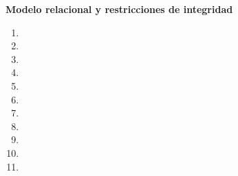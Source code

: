 \documentclass{report}
\begin{document}
    \begin{center}
        \LARGE{\textbf{Modelo relacional y restricciones de integridad}}\vspace{.3cm}
    \end{center}
    \normalsize
    \begin{enumerate}%
        \item 
        \item 
        \item 
        \item 
        \item 
        \item 
        \item 
        \item 
        \item 
        \item 
        \item 
    \end{enumerate}


    \newpage
\printbibliography
  
\end{document}
